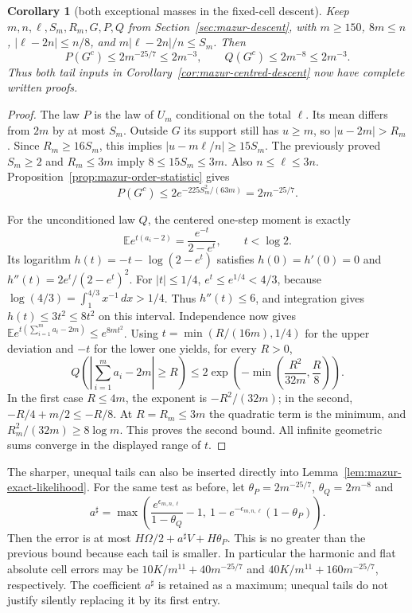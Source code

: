 \documentclass[11pt]{article}
\newtheorem{corollary}[proposition]{Corollary}
\theoremstyle{remark}\newtheorem{remark}[proposition]{Remark}
\begin{document}
\begin{corollary}[both exceptional masses in the fixed-cell descent]
\label{cor:mazur-two-tails}
Keep $m,n,\ell,S_m,R_m,G,P,Q$ from
Section~\ref{sec:mazur-descent}, with
$m\ge150$, $8m\le n$, $|\ell-2n|\le n/8$, and
$m|\ell-2n|/n\le S_m$. Then
\begin{equation}
 P(G^c)\le2m^{-25/7}\le2m^{-3},\qquad
 Q(G^c)\le2m^{-8}\le2m^{-3}.
 \label{eq:mazur-two-tails}
\end{equation}
Thus both tail inputs in Corollary~\ref{cor:mazur-centred-descent}
now have complete written proofs.
\end{corollary}
\begin{proof}
The law $P$ is the law of $U_m$ conditional on the total $\ell$.
Its mean differs from $2m$ by at most $S_m$.
Outside $G$ its support still has $u\ge m$, so $|u-2m|>R_m$.
Since $R_m\ge16S_m$, this implies
$|u-m\ell/n|\ge15S_m$.
The previously proved $S_m\ge2$ and $R_m\le3m$ imply
$8\le15S_m\le3m$. Also $n\le\ell\le3n$.
Proposition~\ref{prop:mazur-order-statistic} gives
\[
 P(G^c)\le2e^{-225S_m^2/(63m)}=2m^{-25/7}.
\]

For the unconditioned law $Q$, the centered one-step moment is exactly
\[
 \mathbb E e^{t(a_i-2)}
       =\frac{e^{-t}}{2-e^t},\qquad t<\log2.
\]
Its logarithm $h(t)=-t-\log(2-e^t)$ satisfies
$h(0)=h'(0)=0$ and $h''(t)=2e^t/(2-e^t)^2$.
For $|t|\le1/4$, $e^t\le e^{1/4}<4/3$, because
$\log(4/3)=\int_1^{4/3}x^{-1}\,dx>1/4$.
Thus $h''(t)\le6$, and integration gives
$h(t)\le3t^2\le8t^2$ on this interval.
Independence now gives
$\mathbb E e^{t(\sum_{i=1}^m a_i-2m)}\le e^{8mt^2}$.
Using $t=\min(R/(16m),1/4)$ for the upper deviation and $-t$
for the lower one yields, for every $R>0$,
\[
 Q\left(\left|\sum_{i=1}^m a_i-2m\right|\ge R\right)
 \le2\exp\left(-\min\left(\frac{R^2}{32m},\frac R8\right)\right).
\]
In the first case $R\le4m$, the exponent is $-R^2/(32m)$;
in the second, $-R/4+m/2\le-R/8$.
At $R=R_m\le3m$ the quadratic term is the minimum, and
$R_m^2/(32m)\ge8\log m$. This proves the second bound.
All infinite geometric sums converge in the displayed range of $t$.
\end{proof}

The sharper, unequal tails can also be inserted directly into
Lemma~\ref{lem:mazur-exact-likelihood}. For the same test as before, let
$\theta_P=2m^{-25/7}$, $\theta_Q=2m^{-8}$ and
\[
 a^\sharp=\max\left(
       \frac{e^{\epsilon_{m,n,\ell}}}{1-\theta_Q}-1,\
       1-e^{-\epsilon_{m,n,\ell}}(1-\theta_P)\right).
\]
Then the error is at most $H\Omega/2+a^\sharp V+H\theta_P$.
This is no greater than the previous bound because each tail is smaller.
In particular the harmonic and flat absolute cell errors may be
$10K/m^{11}+40m^{-25/7}$ and
$40K/m^{11}+160m^{-25/7}$, respectively.
The coefficient $a^\sharp$ is retained as a maximum; unequal tails
do not justify silently replacing it by its first entry.
\end{document}
